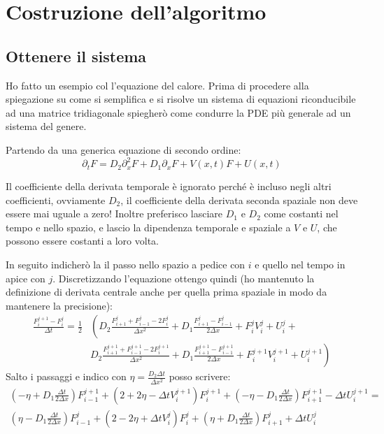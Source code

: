 \documentclass[]{article}
\newcommand{\lr}[3]{\ensuremath{\left#1 #3 \right#2}}
\newcommand{\lrt}[1]{\lr{(}{)}{#1}}
\numberwithin{equation}{subsection}
\begin{document}
\section{Costruzione dell'algoritmo}
\subsection{Ottenere il sistema}
Ho fatto un esempio col l'equazione del calore. Prima di procedere alla spiegazione su come si semplifica e si risolve un sistema di equazioni riconducibile ad una matrice tridiagonale spiegher\`o come condurre la PDE pi\`u generale ad un sistema del genere.

Partendo da una generica equazione di secondo ordine:
\begin{equation}\label{eq:generica}
\partial_t F = D_2 \partial^2_x F + D_1 \partial_x F + V(x,t) F + U(x,t)
\end{equation}

Il coefficiente della derivata temporale \`e ignorato perch\'e \`e incluso negli altri coefficienti, ovviamente $D_2$, il coefficiente della derivata seconda spaziale non deve essere mai uguale a zero!
Inoltre preferisco lasciare $D_1$ e $D_2$ come costanti nel tempo e nello spazio, e lascio la dipendenza temporale e spaziale a $V$ e $U$, che possono essere costanti a loro volta.

In seguito indicher\`o la il passo nello spazio a pedice con $i$ e quello nel tempo in apice con $j$.
Discretizzando l'equazione ottengo quindi (ho mantenuto la definizione di derivata centrale anche per quella prima spaziale in modo da mantenere la precisione):
\begin{equation}
\begin{aligned}
\frac{F_i^{j+1} - F_i^j}{\Delta t} = \frac 12&\lr(.{D_2\frac{F^j_{i+1}+F^{j}_{i-1}-2F_i^{j}}{\Delta x^2} + D_1\frac{F^j_{i+1}-F^{j}_{i-1}}{2\Delta x} + F_i^j V_i^j + U_i^j+}\\
&\lr.){D_2\frac{F^{j+1}_{i+1}+F^{j+1}_{i-1}-2F_i^{j+1}}{\Delta x^2} + D_1\frac{F^{j+1}_{i+1}-F^{j+1}_{i-1}}{2\Delta x} + F_i^{j+1} V_i^{j+1} + U_i^{j+1}}
\end{aligned}
\end{equation}
Salto i passaggi e indico con $\eta = \frac {D_2 \Delta t}{\Delta x^2}$ posso scrivere:
\begin{equation}
\begin{aligned}
\lrt{-\eta+D_1\frac{\Delta t}{2\Delta x}}F_{i-1}^{j+1} + \lrt{2 + 2\eta- \Delta t V_i^{j+1}} F^{j+1}_i + \lrt{-\eta-D_1\frac{\Delta t}{2\Delta x}}F_{i+1}^{j+1} - \Delta t U_i^{j+1} = \\
\lrt{\eta-D_1\frac{\Delta t}{2\Delta x}}F_{i-1}^{j} + \lrt{2-2\eta+\Delta t V_i^{j}} F^{j}_i + \lrt{\eta +D_1\frac{\Delta t}{2\Delta x}}F_{i+1}^{j} + \Delta t U_i^{j}
\end{aligned}
\end{equation}
\end{document}
